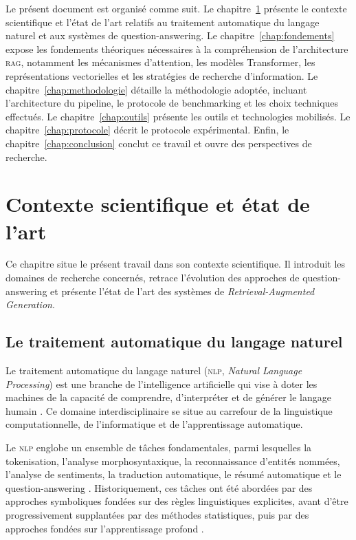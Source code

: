 \documentclass[12pt,a4paper,oneside]{report}
\newcommand{\rag}{\textsc{rag}}
\newcommand{\nlp}{\textsc{nlp}}
\begin{document}
Le présent document est organisé comme suit. Le chapitre~\ref{chap:contexte} présente le contexte scientifique et l'état de l'art relatifs au traitement automatique du langage naturel et aux systèmes de question-answering. Le chapitre~\ref{chap:fondements} expose les fondements théoriques nécessaires à la compréhension de l'architecture \rag{}, notamment les mécanismes d'attention, les modèles Transformer, les représentations vectorielles et les stratégies de recherche d'information. Le chapitre~\ref{chap:methodologie} détaille la méthodologie adoptée, incluant l'architecture du pipeline, le protocole de benchmarking et les choix techniques effectués. Le chapitre~\ref{chap:outils} présente les outils et technologies mobilisés. Le chapitre~\ref{chap:protocole} décrit le protocole expérimental. Enfin, le chapitre~\ref{chap:conclusion} conclut ce travail et ouvre des perspectives de recherche.


\chapter{Contexte scientifique et état de l'art}
\label{chap:contexte}

Ce chapitre situe le présent travail dans son contexte scientifique. Il introduit les domaines de recherche concernés, retrace l'évolution des approches de question-answering et présente l'état de l'art des systèmes de \textit{Retrieval-Augmented Generation}.

\section{Le traitement automatique du langage naturel}

Le traitement automatique du langage naturel (\nlp{}, \textit{Natural Language Processing}) est une branche de l'intelligence artificielle qui vise à doter les machines de la capacité de comprendre, d'interpréter et de générer le langage humain \citep{jurafsky2024}. Ce domaine interdisciplinaire se situe au carrefour de la linguistique computationnelle, de l'informatique et de l'apprentissage automatique.

Le \nlp{} englobe un ensemble de tâches fondamentales, parmi lesquelles la tokenisation, l'analyse morphosyntaxique, la reconnaissance d'entités nommées, l'analyse de sentiments, la traduction automatique, le résumé automatique et le question-answering \citep{jurafsky2024}. Historiquement, ces tâches ont été abordées par des approches symboliques fondées sur des règles linguistiques explicites, avant d'être progressivement supplantées par des méthodes statistiques, puis par des approches fondées sur l'apprentissage profond \citep{goldberg2017}.
\end{document}
